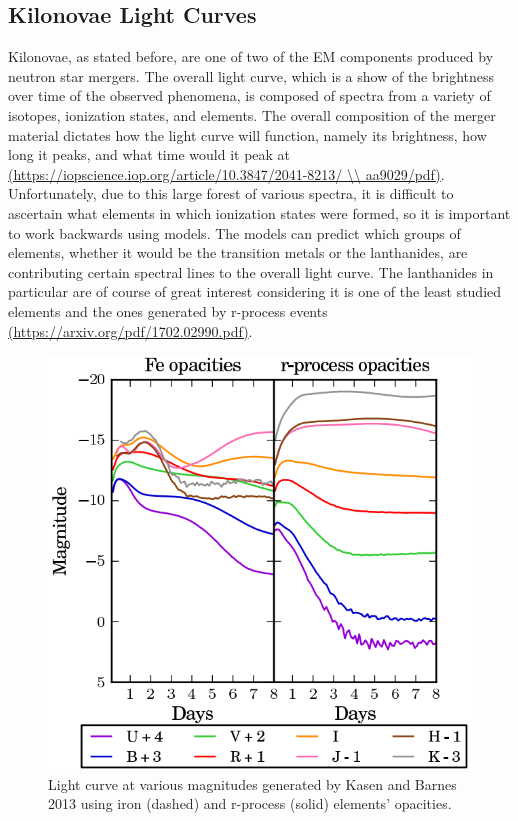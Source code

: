 \documentclass[11pt,a4paper]{article}
\begin{document}
\subsection{Kilonovae Light Curves}

Kilonovae, as stated before, are one of two of the EM components produced by neutron star mergers. The overall light curve, which is a show of the brightness over time of the observed phenomena, is composed of spectra from a variety of isotopes, ionization states, and elements. The overall composition of the merger material dictates how the light curve will function, namely its brightness, how long it peaks, and what time would it peak at \url{(https://iopscience.iop.org/article/10.3847/2041-8213/ \\ aa9029/pdf)}.
Unfortunately, due to this large forest of various spectra, it is difficult to ascertain what elements in which ionization states were formed, so it is important to work backwards using models. The models can predict which groups of elements, whether it would be the transition metals or the lanthanides, are contributing certain spectral lines to the overall light curve. The lanthanides in particular are of course of great interest considering it is one of the least studied elements and the ones generated by r-process events \url{(https://arxiv.org/pdf/1702.02990.pdf)}.

\begin{figure}[h!]
  \includegraphics[width=1\textwidth]{light_curve.png}
  \caption{Light curve at various magnitudes generated by Kasen and Barnes 2013 using iron (dashed) and r-process (solid) elements' opacities.  }
\end{figure}
\end{document}
